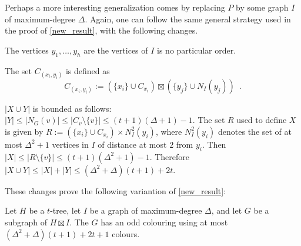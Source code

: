 \documentclass{patmorin}
\begin{document}
Perhaps a more interesting generalization comes by replacing $P$ by some graph $I$ of maximum-degree $\Delta$.  Again, one can follow the same general strategy used in the proof of \cref{new_result}, with the following changes.
\begin{compactitem}
  \item The vertices $y_1,\ldots,y_h$ are the vertices of $I$ is no particular order.
  \item The set $C_{(x_i,y_i)}$ is defined as
\[
    C_{(x_i,y_i)}:=(\{x_i\}\cup C_{x_i})\boxtimes (\{y_j\}\cup N_I(y_j)) \enspace .
\]
  \item $|X\cup Y|$ is bounded as follows: $|Y|\le|N_G(v)|\le |C_v\setminus\{v\}| \le (t+1)(\Delta+1)-1$.  The set $R$ used to define $X$ is given by $R:=(\{x_i\}\cup C_{x_i})\times N^2_I(y_i)$, where $N^2_I(y_i)$ denotes the set of at most $\Delta^2+1$ vertices in $I$ of distance at most $2$ from $y_i$.  Then $|X|\le|R\setminus\{v\}|\le (t+1)(\Delta^2+1)-1$.  Therefore $|X\cup Y|\le |X|+|Y|\le (\Delta^2+\Delta)(t+1)+2t$.
\end{compactitem}
These changes prove the following variantion of \cref{new_result}:

\begin{thm}\label{new_result_delta}
  Let $H$ be a $t$-tree, let $I$ be a graph of maximum-degree $\Delta$, and let $G$ be a subgraph of $H\boxtimes I$.  The $G$ has an odd colouring using at most $(\Delta^2+\Delta)(t+1)+2t+1$ colours.
\end{thm}



%
%
%



\end{document}
